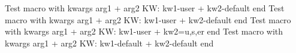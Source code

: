 \documentclass{article}
\author{Macro Kwarg Test}
\begin{document}
	Test macro with kwargs arg1 + arg2 KW: kw1-user + kw2-default end
	Test macro with kwargs arg1 + arg2 KW: kw1-user + kw2-default end
	Test macro with kwargs arg1 + arg2 KW: kw1-user + {kw2=u,s,er} end
	Test macro with kwargs arg1 + arg2 KW: kw1-default + kw2-default end
\end{document}
